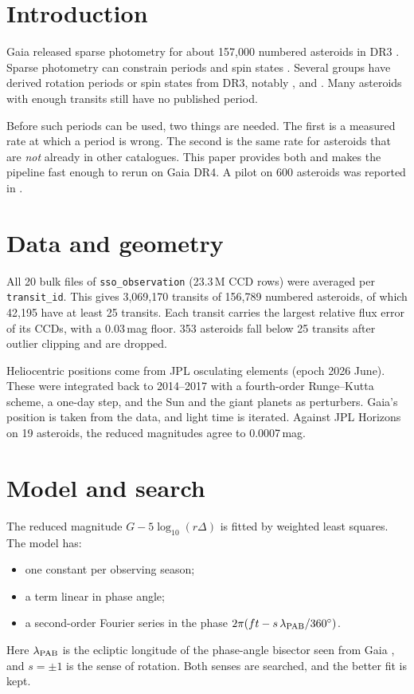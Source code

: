 \section{Introduction}

Gaia \citep{Prusti2016} released sparse photometry for about 157{,}000 numbered asteroids in DR3
\citep{Vallenari2023,Tanga2023}. Sparse photometry can constrain periods and spin states
\citep{Kaasalainen2004}. Several groups have derived rotation periods or spin states from DR3, notably
\citet{Durech2023}, \citet{Cellino2024} and \citet{MacLennan2026}. Many asteroids with enough transits
still have no published period.

Before such periods can be used, two things are needed. The first is a measured rate at which a period is
wrong. The second is the same rate for asteroids that are \emph{not} already in other catalogues. This
paper provides both and makes the pipeline fast enough to rerun on Gaia DR4. A pilot on 600 asteroids was
reported in \citet{Tropynin2026a}.

\section{Data and geometry}

All 20 bulk files of \texttt{sso\_observation} (23.3\,M CCD rows) were averaged per \texttt{transit\_id}.
This gives 3{,}069{,}170 transits of 156{,}789 numbered asteroids, of which 42{,}195 have at least 25
transits. Each transit carries the largest relative flux error of its CCDs, with a 0.03\,mag floor.
353 asteroids fall below 25 transits after outlier clipping and are dropped.

Heliocentric positions come from JPL osculating elements (epoch 2026 June). These were integrated back to
2014--2017 with a fourth-order Runge--Kutta scheme, a one-day step, and the Sun and the giant planets as
perturbers. Gaia's position is taken from the data, and light time is iterated. Against JPL Horizons on
19 asteroids, the reduced magnitudes agree to 0.0007\,mag.

\section{Model and search}

The reduced magnitude $G-5\log_{10}(r\Delta)$ is fitted by weighted least squares. The model has:
\begin{itemize}
\item one constant per observing season;
\item a term linear in phase angle;
\item a second-order Fourier series in the phase $2\pi(ft - s\,\lambda_{\rm PAB}/360^\circ)$.
\end{itemize}
Here $\lambda_{\rm PAB}$ is the ecliptic longitude of the phase-angle bisector seen from Gaia
\citep{Harris1984}, and $s=\pm1$ is the sense of rotation. Both senses are searched, and the better fit is
kept.

